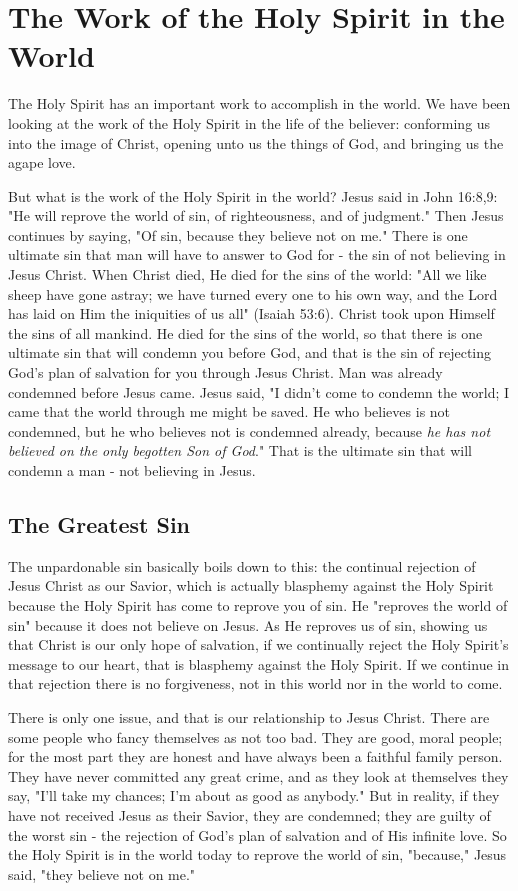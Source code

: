 \chapter{The Work of the Holy Spirit in the World}

The Holy Spirit has an important work to accomplish in the world. We have been looking at the work of the Holy Spirit in the life of the believer: conforming us into the image of Christ, opening unto us the things of God, and bringing us the agape love. 

But what is the work of the Holy Spirit in the world? Jesus said in John 16:8,9: "He will reprove the world of sin, of righteousness, and of judgment." Then Jesus continues by saying, "Of sin, because they believe not on me." There is one ultimate sin that man will have to answer to God for - the sin of not believing in Jesus Christ. When Christ died, He died for the sins of the world: "All we like sheep have gone astray; we have turned every one to his own way, and the Lord has laid on Him the iniquities of us all" (Isaiah 53:6). Christ took upon Himself the sins of all mankind. He died for the sins of the world, so that there is one ultimate sin that will condemn you before God, and that is the sin of rejecting God's plan of salvation for you through Jesus Christ. Man was already condemned before Jesus came. Jesus said, "I didn't come to condemn the world; I came that the world through me might be saved. He who believes is not condemned, but he who believes not is condemned already, because \emph{he has not believed on the only begotten Son of God}." That is the ultimate sin that will condemn a man - not believing in Jesus. 

\section*{The Greatest Sin}

The unpardonable sin basically boils down to this: the continual rejection of Jesus Christ as our Savior, which is actually blasphemy against the Holy Spirit because the Holy Spirit has come to reprove you of sin. He "reproves the world of sin" because it does not believe on Jesus. As He reproves us of sin, showing us that Christ is our only hope of salvation, if we continually reject the Holy Spirit's message to our heart, that is blasphemy against the Holy Spirit. If we continue in that rejection there is no forgiveness, not in this world nor in the world to come. 

There is only one issue, and that is our relationship to Jesus Christ. There are some people who fancy themselves as not too bad. They are good, moral people; for the most part they are honest and have always been a faithful family person. They have never committed any great crime, and as they look at themselves they say, "I'll take my chances; I'm about as good as anybody." But in reality, if they have not received Jesus as their Savior, they are condemned; they are guilty of the worst sin - the rejection of God's plan of salvation and of His infinite love. So the Holy Spirit is in the world today to reprove the world of sin, "because," Jesus said, "they believe not on me." 

